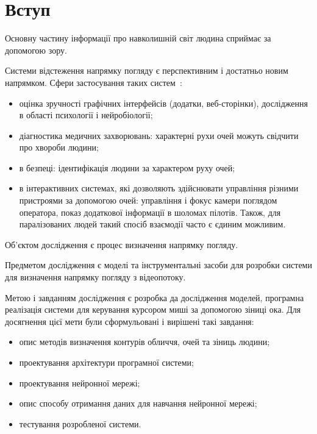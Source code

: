\section*{Вступ}

Основну частину інформації про навколишній світ людина сприймає за допомогою зору. 

Системи відстеження напрямку погляду є перспективним і достатньо новим напрямком.
Сфери застосування таких систем~\cite{eyeControllPresentAndFuture}:
\begin{itemize}
	\item оцінка зручності графічних інтерфейсів (додатки, веб-сторінки), дослідження в області психології і нейробіології;
	\item діагностика медичних захворювань: характерні рухи очей можуть свідчити про хвороби людини;
	\item в безпеці: ідентифікація людини за характером руху очей;
 	\item в інтерактивних системах, які дозволяють здійснювати управління різними пристроями за допомогою очей: управління і фокус камери поглядом оператора, показ додаткової інформації в шоломах пілотів. Також, для паралізованих людей такий спосіб взаємодії часто є єдиним можливим.
\end{itemize}

Об'єктом дослідження є процес визначення напрямку погляду.

Предметом дослідження є моделі та інструментальні засоби для розробки системи для визначення напрямку погляду з відеопотоку.

Метою і завданням дослідження є розробка да дослідження моделей, програмна реалізація системи для керування курсором миші за допомогою зіниці ока.
Для досягнення цієї мети були сформульовані і вирішені такі завдання:
\begin{itemize}
	\item опис методів визначення контурів обличчя, очей та зіниць людини;
	\item проектування архітектури програмної системи;
	\item проектування нейронної мережі;
	\item опис способу отримання даних для навчання нейронної мережі;
	\item тестування розробленої системи.
\end{itemize}
